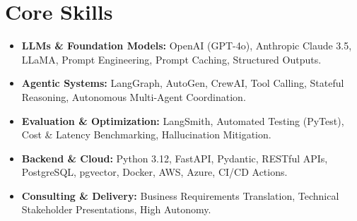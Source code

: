 \documentclass[a4paper,10pt]{article}
\begin{document}
\section{Core Skills}
\begin{itemize}
  \item \textbf{LLMs \& Foundation Models:} OpenAI (GPT-4o), Anthropic Claude 3.5, LLaMA, Prompt Engineering, Prompt Caching, Structured Outputs.
  \item \textbf{Agentic Systems:} LangGraph, AutoGen, CrewAI, Tool Calling, Stateful Reasoning, Autonomous Multi-Agent Coordination.
  \item \textbf{Evaluation \& Optimization:} LangSmith, Automated Testing (PyTest), Cost \& Latency Benchmarking, Hallucination Mitigation.
  \item \textbf{Backend \& Cloud:} Python 3.12, FastAPI, Pydantic, RESTful APIs, PostgreSQL, pgvector, Docker, AWS, Azure, CI/CD Actions.
  \item \textbf{Consulting \& Delivery:} Business Requirements Translation, Technical Stakeholder Presentations, High Autonomy.
\end{itemize}
\end{document}
